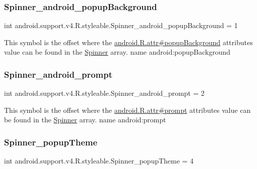 \subsubsection{\texorpdfstring{Spinner\+\_\+android\+\_\+popup\+Background}{Spinner\_android\_popupBackground}}
{\footnotesize\ttfamily int android.\+support.\+v4.\+R.\+styleable.\+Spinner\+\_\+android\+\_\+popup\+Background = 1\hspace{0.3cm}{\ttfamily [static]}}

This symbol is the offset where the \hyperlink{}{android.\+R.\+attr\#popup\+Background} attribute\textquotesingle{}s value can be found in the \hyperlink{classandroid_1_1support_1_1v4_1_1R_1_1styleable_a34e1edd521133711195b551c5477c69d}{Spinner} array.  name android\+:popup\+Background \mbox{\label{classandroid_1_1support_1_1v4_1_1R_1_1styleable_a509106a0db8c7a05859fb9c2c80450da}} 
\subsubsection{\texorpdfstring{Spinner\+\_\+android\+\_\+prompt}{Spinner\_android\_prompt}}
{\footnotesize\ttfamily int android.\+support.\+v4.\+R.\+styleable.\+Spinner\+\_\+android\+\_\+prompt = 2\hspace{0.3cm}{\ttfamily [static]}}

This symbol is the offset where the \hyperlink{}{android.\+R.\+attr\#prompt} attribute\textquotesingle{}s value can be found in the \hyperlink{classandroid_1_1support_1_1v4_1_1R_1_1styleable_a34e1edd521133711195b551c5477c69d}{Spinner} array.  name android\+:prompt \mbox{\label{classandroid_1_1support_1_1v4_1_1R_1_1styleable_a675a1650fe62d85b9e1c1f38de977d94}} 
\subsubsection{\texorpdfstring{Spinner\+\_\+popup\+Theme}{Spinner\_popupTheme}}
{\footnotesize\ttfamily int android.\+support.\+v4.\+R.\+styleable.\+Spinner\+\_\+popup\+Theme = 4\hspace{0.3cm}{\ttfamily [static]}}


